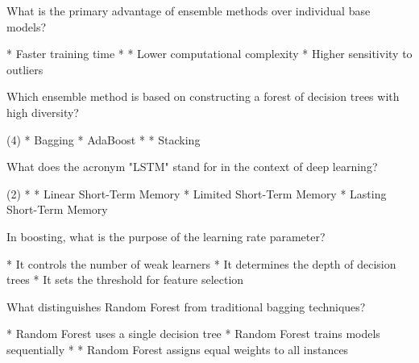\documentclass[10pt]{extarticle}
\begin{document}
\begin{exercise}
    What is the primary advantage of ensemble methods over individual base models?
    \begin{choice}
        * Faster training time
        * 
        * Lower computational complexity
        * Higher sensitivity to outliers
    \end{choice}
\end{exercise}
\begin{solution}
\end{solution}

\begin{exercise}
    Which ensemble method is based on constructing a forest of decision trees with high diversity?
    \begin{choice}(4)
        * Bagging
        * AdaBoost
        * 
        * Stacking
    \end{choice}
\end{exercise}
\begin{solution}
\end{solution}

\begin{exercise}
    What does the acronym "LSTM" stand for in the context of deep learning?
    \begin{choice}(2)
        * 
        * Linear Short-Term Memory
        * Limited Short-Term Memory
        * Lasting Short-Term Memory
    \end{choice}
\end{exercise}
\begin{solution}
\end{solution}

\begin{exercise}
    In boosting, what is the purpose of the learning rate parameter?
    \begin{choice}
        * It controls the number of weak learners
        * It determines the depth of decision trees
        * It sets the threshold for feature selection
    \end{choice}
\end{exercise}
\begin{solution}
\end{solution}

\begin{exercise}
    What distinguishes Random Forest from traditional bagging techniques?
    \begin{choice}
        * Random Forest uses a single decision tree
        * Random Forest trains models sequentially
        * 
        * Random Forest assigns equal weights to all instances
    \end{choice}
\end{exercise}
\begin{solution}
\end{solution}
\end{document}
